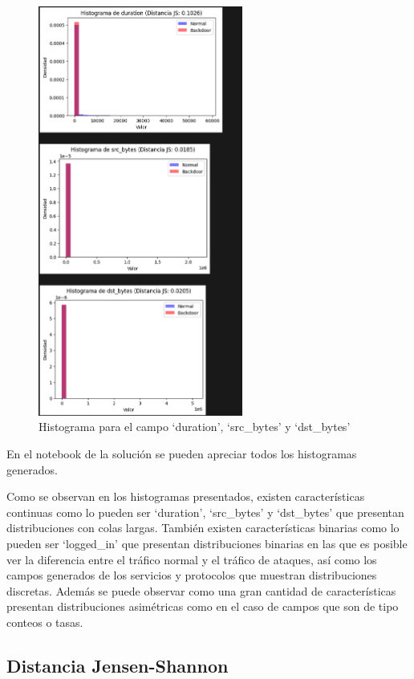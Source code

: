 \documentclass[12pt,a4paper]{article}
\begin{document}
\begin{figure}[htpb]
  \centering
  \includegraphics[width=0.6\textwidth]{images/histogramas}
  \caption{Histograma para el campo `duration', `src_bytes' y `dst_bytes'}\label{fig:figure}
\end{figure}

En el notebook de la solución se pueden apreciar todos los histogramas generados.

Como se observan en los histogramas presentados, existen características continuas como lo pueden ser
`duration', `src_bytes' y `dst_bytes' que presentan distribuciones con colas largas.
También existen características binarias como lo pueden ser `logged_in' que presentan distribuciones binarias en las que es posible ver
la diferencia entre el tráfico normal y el tráfico de ataques, así como los campos generados de los servicios y protocolos que muestran distribuciones discretas.
Además se puede observar como una gran cantidad de características presentan distribuciones asimétricas como
en el caso de campos que son de tipo conteos o tasas.

\subsection{Distancia Jensen-Shannon}\label{subsec:distancia-jensen-shannon}
\end{document}
